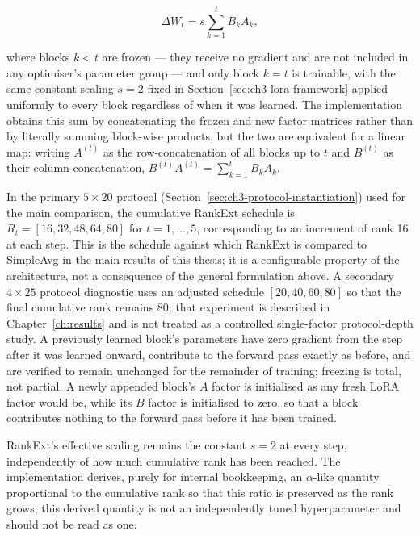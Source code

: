\begin{equation}
\label{eq:ch3-rankext-cumulative}
\Delta W_t = s \sum_{k=1}^{t} B_k A_k,
\end{equation}

where blocks $k<t$ are frozen --- they receive no gradient and are not
included in any optimiser's parameter group --- and only block $k=t$ is
trainable, with the same constant scaling $s=2$ fixed in Section~\ref{sec:ch3-lora-framework}
applied uniformly to every block regardless of when it was learned. The
implementation obtains this sum by concatenating the frozen and new factor
matrices rather than by literally summing block-wise products, but the two
are equivalent for a linear map: writing $A^{(t)}$ as the row-concatenation
of all blocks up to $t$ and $B^{(t)}$ as their column-concatenation,
$B^{(t)}A^{(t)} = \sum_{k=1}^{t} B_k A_k$.

In the primary $5\times20$ protocol (Section~\ref{sec:ch3-protocol-instantiation})
used for the main comparison, the cumulative RankExt schedule is
$R_t=[16,32,48,64,80]$ for $t=1,\dots,5$, corresponding to an increment of
rank 16 at each step. This is the schedule against which RankExt is
compared to SimpleAvg in the main results of this thesis; it is a
configurable property of the architecture, not a consequence of the
general formulation above. A secondary $4\times25$ protocol diagnostic
uses an adjusted schedule $[20,40,60,80]$ so that the final cumulative rank
remains 80; that experiment is described in Chapter~\ref{ch:results} and is
not treated as a controlled single-factor protocol-depth study. A previously learned block's parameters have zero gradient from
the step after it was learned onward, contribute to the forward pass
exactly as before, and are verified to remain unchanged for the remainder
of training; freezing is total, not partial. A newly appended block's $A$
factor is initialised as any fresh LoRA factor would be, while its $B$
factor is initialised to zero, so that a block contributes nothing to the
forward pass before it has been trained.

RankExt's effective scaling remains the constant $s=2$ at every step,
independently of how much cumulative rank has been reached. The
implementation derives, purely for internal bookkeeping, an $\alpha$-like
quantity proportional to the cumulative rank so that this ratio is
preserved as the rank grows; this derived quantity is not an independently
tuned hyperparameter and should not be read as one.

